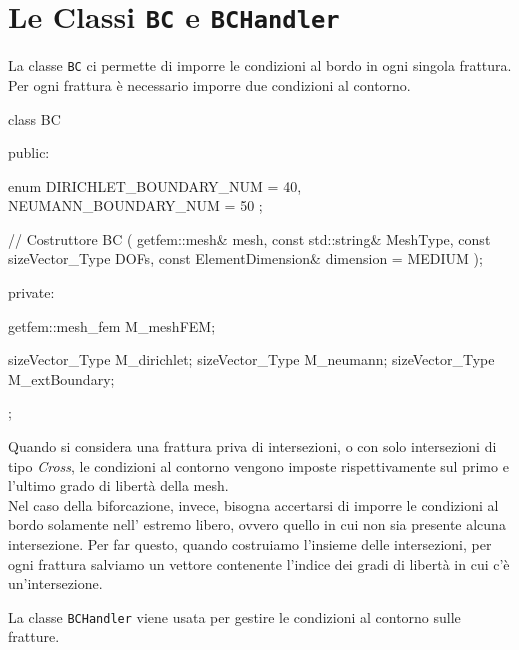 \section{Le Classi \texttt{BC} e \texttt{BCHandler}}
La classe \texttt{BC} ci permette di imporre le condizioni al bordo in ogni singola frattura. Per ogni frattura è necessario imporre due condizioni al contorno.\\ 

\begin{Code}[caption={Classe \texttt{BC}}]
class BC
{
 public:

    enum
    {
        DIRICHLET_BOUNDARY_NUM = 40,
        NEUMANN_BOUNDARY_NUM = 50
    };

    // Costruttore
    BC ( getfem::mesh& mesh,
         const std::string& MeshType,
         const sizeVector_Type DOFs,
         const ElementDimension& dimension = MEDIUM );

 private:

    getfem::mesh_fem M_meshFEM;
    
    sizeVector_Type M_dirichlet;
    sizeVector_Type M_neumann;
    sizeVector_Type M_extBoundary;   
};
\end{Code}

Quando si considera una frattura priva di intersezioni, o con solo intersezioni di tipo \textit{Cross}, le condizioni al contorno vengono imposte rispettivamente sul primo e l'ultimo grado di libertà della mesh.\\
Nel caso della biforcazione, invece, bisogna accertarsi di imporre le condizioni al bordo solamente nell' estremo libero, ovvero quello in cui non sia presente alcuna intersezione. 
Per far questo, quando costruiamo l'insieme delle intersezioni, per ogni frattura salviamo un vettore contenente l'indice dei gradi di libertà in cui c'è un'intersezione.

La classe \texttt{BCHandler} viene usata per gestire le condizioni al contorno sulle fratture.
